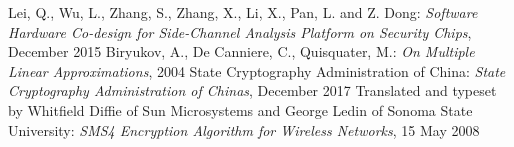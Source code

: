 \newpage
\renewcommand\refname{Bibliografia}

\begin{thebibliography}{99}
 Lei, Q., Wu, L., Zhang, S., Zhang, X., Li, X., Pan, L. and Z. Dong:
\emph{Software Hardware Co-design for Side-Channel Analysis Platform on Security Chips},
December 2015
 Biryukov, A., De Canniere, C., Quisquater, M.:
\emph{On Multiple Linear Approximations},
2004
 State Cryptography Administration of China:
\emph{State Cryptography Administration of Chinas},
December 2017
 Translated and typeset by Whitfield Diffie of Sun Microsystems
and George Ledin of Sonoma State University: \emph{SMS4 Encryption Algorithm for Wireless Networks},
15 May 2008

\end{thebibliography}

